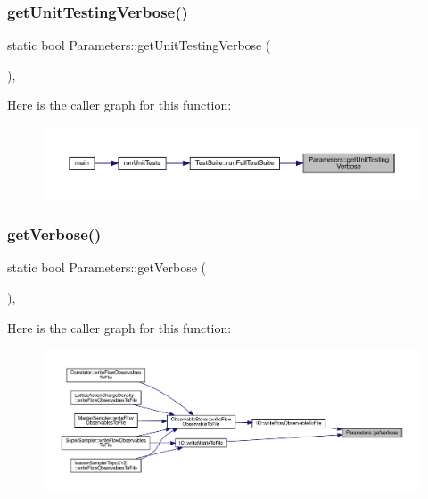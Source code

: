 \subsubsection{\texorpdfstring{getUnitTestingVerbose()}{getUnitTestingVerbose()}}
{\footnotesize\ttfamily static bool Parameters\+::get\+Unit\+Testing\+Verbose (\begin{DoxyParamCaption}{ }\end{DoxyParamCaption})\hspace{0.3cm}{\ttfamily [inline]}, {\ttfamily [static]}}

Here is the caller graph for this function\+:
\nopagebreak
\begin{figure}[H]
\begin{center}
\leavevmode
\includegraphics[width=350pt]{class_parameters_a2645617063e170828a3da439094ab626_icgraph}
\end{center}
\end{figure}
\mbox{\label{class_parameters_a07453f20719f54f9fd6f72d311638b39}} 
\subsubsection{\texorpdfstring{getVerbose()}{getVerbose()}}
{\footnotesize\ttfamily static bool Parameters\+::get\+Verbose (\begin{DoxyParamCaption}{ }\end{DoxyParamCaption})\hspace{0.3cm}{\ttfamily [inline]}, {\ttfamily [static]}}

Here is the caller graph for this function\+:
\nopagebreak
\begin{figure}[H]
\begin{center}
\leavevmode
\includegraphics[width=350pt]{class_parameters_a07453f20719f54f9fd6f72d311638b39_icgraph}
\end{center}
\end{figure}
\mbox{\label{class_parameters_aa7436b658d07358009b922584798fb6d}} 
